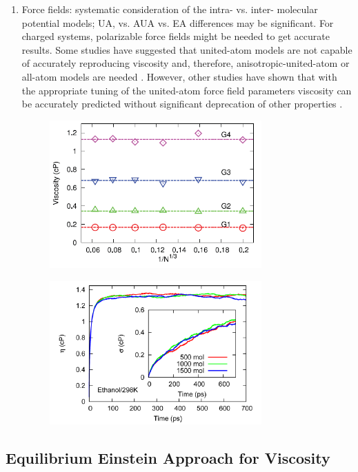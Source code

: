 \documentclass[9pt]{livecoms}
\begin{document}
\begin{enumerate}
	\item Force fields: systematic consideration of the intra- vs. inter- molecular potential models; UA, vs. AUA vs. EA differences may be significant. For charged systems, polarizable force fields might be needed to get accurate results. Some studies have suggested that united-atom models are not capable of accurately reproducing viscosity and, therefore, anisotropic-united-atom or all-atom models are needed \cite{Allen1987,Payal2012,Mondello1997}. However, other studies have shown that with the appropriate tuning of the united-atom force field parameters viscosity can be accurately predicted without significant deprecation of other properties \cite{Gordon2006}.
	
	\begin{figure}[htb!]
		\centering
		\includegraphics[width=3.2in]{figures/MoultosFig3.png}
		\caption{}
		\label{fig:MoultosFig3}
	\end{figure}

	\begin{figure}[htb!]
		\centering
		\includegraphics[width=3.2in]{figures/ZhangFig9.png}
		\caption{}
		\label{fig:ZhangFig9}
	\end{figure}
	
\end{enumerate}

\subsection{Equilibrium Einstein Approach for Viscosity}
\end{document}
